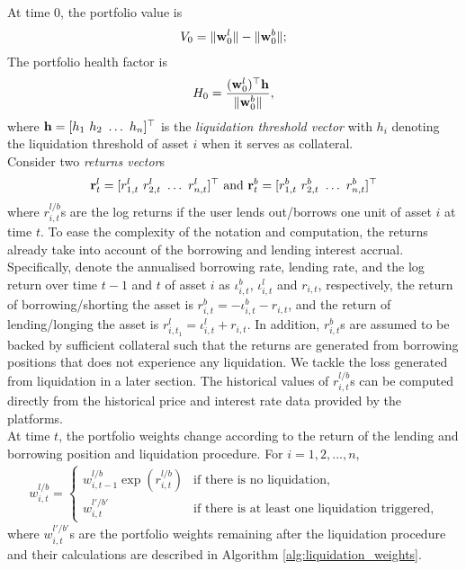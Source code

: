 \documentclass{article} %
\theoremstyle{plain}
\theoremstyle{definition} %
\begin{document}
At time $0$, the portfolio value is 
\begin{align*}
  V_0 = \|{\bf w}^l_0\| - \|{\bf w}^b_0\| ;
  \end{align*}
The portfolio health factor is 
\begin{align*}
H_0 = \frac{({\bf w}^l_0)^\top {\bf h} }{\|{\bf w}^b_0\|},
\end{align*}
where ${\bf h}=[h_1\ h_2\ \dots\ h_n]^\top$ is the \textit{liquidation threshold vector} with $h_i$ denoting the liquidation threshold of asset $i$ when it serves as collateral. \\

Consider two \textit{returns vector}s 
\begin{align*}
  {\bf{r}}^l_t = [r_{1,t}^l\ r_{2,t}^l\ \dots \ r^l_{n,t}]^\top \text{ and } {\bf{r}}^b_t = [r^b_{1,t}\ r^b_{2,t}\ \dots\ r^b_{n,t}]^\top
\end{align*}
where $r^{l/b}_{i,t}$s are the log returns if the user lends out/borrows one unit of asset $i$ at time $t$. 
To ease the complexity of the notation and computation, the returns already take into account of the borrowing and lending interest accrual. 
Specifically, denote the annualised borrowing rate, lending rate, and the log return over time $t-1$ and $t$ of asset $i$ as $\iota^b_{i,t}$, $\iota^l_{i, t}$ and $r_{i,t}$, respectively,
the return of borrowing/shorting the asset is $r^b_{i,t} =  -\iota^b_{i,t} - r_{i,t}$, and the return of lending/longing the asset is $r^l_{i,t_1} =  \iota^l_{i,t} + r_{i,t}$.
In addition, $r^{b}_{i,t}$s are assumed to be backed by sufficient collateral such that the returns are generated from borrowing positions that does not experience any liquidation.
We tackle the loss generated from liquidation in a later section. 
The historical values of $r^{l/b}_{i,t}$s can be computed directly from the historical price and interest rate data provided by the platforms.\\

At time $t$, the portfolio weights change according to the return of the lending and borrowing position and liquidation procedure. For $i=1,2,...,n$,
\begin{align*}
  w^{l/b}_{i,t} =\begin{cases}
     w^{l/b}_{i,t-1} \exp(r^{l/b}_{i,t})  &\text{if there is no liquidation,}\\
     w^{l'/b'}_{i,t} &\text{if there is at least one liquidation triggered,}
    \end{cases}
  \end{align*}
  where $w^{l'/b'}_{i,t}$s are the portfolio weights remaining after the liquidation procedure and their calculations are described in Algorithm \ref{alg:liquidation_weights}.\\
\end{document}
